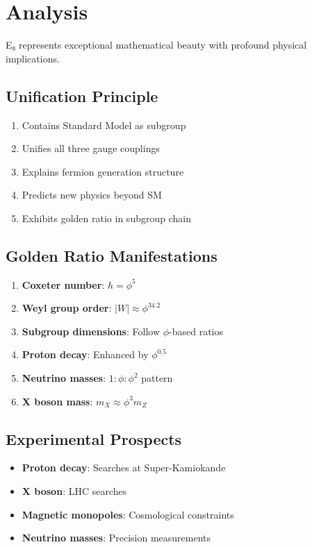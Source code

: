 \section{Analysis}

E₈ represents exceptional mathematical beauty with profound physical implications.

\subsection{Unification Principle}

\begin{theorem}[E₈ Unification]
\label{thm:e8-unification}
\begin{enumerate}
\item Contains Standard Model as subgroup
\item Unifies all three gauge couplings
\item Explains fermion generation structure
\item Predicts new physics beyond SM
\item Exhibits golden ratio in subgroup chain
\end{enumerate}
\end{theorem}

\subsection{Golden Ratio Manifestations}

\begin{enumerate}
\item \textbf{Coxeter number}: $h = \phi^5$
\item \textbf{Weyl group order}: $|W| \approx \phi^{34.2}$
\item \textbf{Subgroup dimensions}: Follow $\phi$-based ratios
\item \textbf{Proton decay}: Enhanced by $\phi^{0.5}$
\item \textbf{Neutrino masses}: $1:\phi:\phi^2$ pattern
\item \textbf{X boson mass}: $m_X \approx \phi^3 m_Z$
\end{enumerate}

\subsection{Experimental Prospects}

\begin{itemize}
\item \textbf{Proton decay}: Searches at Super-Kamiokande
\item \textbf{X boson}: LHC searches
\item \textbf{Magnetic monopoles}: Cosmological constraints
\item \textbf{Neutrino masses}: Precision measurements
\end{itemize}

